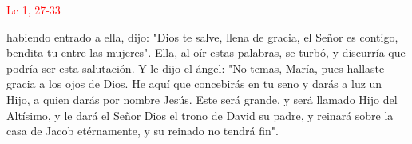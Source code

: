 \hfill\textcolor{red}{Lc 1, 27-33}

habiendo entrado a ella, dijo: "Dios te salve, llena de gracia, el Señor es contigo, bendita tu entre las mujeres". Ella, al oír estas palabras, se turbó,
y discurría que podría ser esta salutación. Y le dijo el ángel: "No temas, María, pues hallaste gracia a los ojos de Dios. He aquí que concebirás en tu seno y darás a luz un Hijo,
a quien darás por nombre Jesús. Este será grande, y será llamado Hijo del Altísimo, y le dará el Señor Dios el trono de David su padre, y reinará sobre la casa de Jacob etérnamente, 
y su reinado no tendrá fin".
